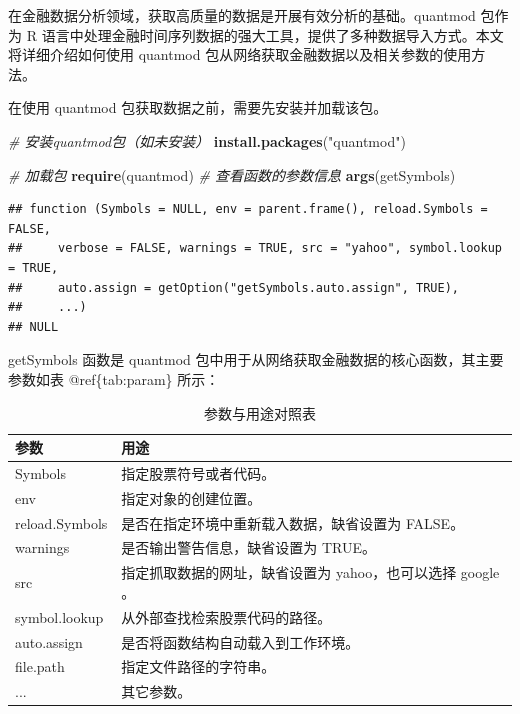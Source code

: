 \documentclass[]{ctexbook}
\newenvironment{Shaded}{\begin{snugshade}}{\end{snugshade}}
\newcommand{\CommentTok}[1]{\textcolor[rgb]{0.56,0.35,0.01}{\textit{#1}}}
\newcommand{\FunctionTok}[1]{\textcolor[rgb]{0.13,0.29,0.53}{\textbf{#1}}}
\newcommand{\NormalTok}[1]{#1}
\newcommand{\StringTok}[1]{\textcolor[rgb]{0.31,0.60,0.02}{#1}}
\begin{document}
在金融数据分析领域，获取高质量的数据是开展有效分析的基础。quantmod 包作为 R 语言中处理金融时间序列数据的强大工具，提供了多种数据导入方式。本文将详细介绍如何使用 quantmod 包从网络获取金融数据以及相关参数的使用方法。

在使用 quantmod 包获取数据之前，需要先安装并加载该包。

\begin{Shaded}
\begin{Highlighting}[]
\CommentTok{\# 安装quantmod包（如未安装）}
\FunctionTok{install.packages}\NormalTok{(}\StringTok{"quantmod"}\NormalTok{)}
\end{Highlighting}
\end{Shaded}

\begin{Shaded}
\begin{Highlighting}[]
\CommentTok{\# 加载包}
\FunctionTok{require}\NormalTok{(quantmod)}
\CommentTok{\# 查看函数的参数信息}
\FunctionTok{args}\NormalTok{(getSymbols)}
\end{Highlighting}
\end{Shaded}

\begin{verbatim}
## function (Symbols = NULL, env = parent.frame(), reload.Symbols = FALSE, 
##     verbose = FALSE, warnings = TRUE, src = "yahoo", symbol.lookup = TRUE, 
##     auto.assign = getOption("getSymbols.auto.assign", TRUE), 
##     ...) 
## NULL
\end{verbatim}

getSymbols 函数是 quantmod 包中用于从网络获取金融数据的核心函数，其主要参数如表 @ref\{tab:param\} 所示：

\begin{table}

\caption{\label{tab:param}参数与用途对照表}
\centering
\begin{tabular}[t]{ll}
\toprule
参数 & 用途\\
\midrule
Symbols & 指定股票符号或者代码。\\
env & 指定对象的创建位置。\\
reload.Symbols & 是否在指定环境中重新载入数据，缺省设置为 FALSE。\\
warnings & 是否输出警告信息，缺省设置为 TRUE。\\
src & 指定抓取数据的网址，缺省设置为 yahoo，也可以选择 google 。\\
\addlinespace
symbol.lookup & 从外部查找检索股票代码的路径。\\
auto.assign & 是否将函数结构自动载入到工作环境。\\
file.path & 指定文件路径的字符串。\\
... & 其它参数。\\
\bottomrule
\end{tabular}
\end{table}
\end{document}
